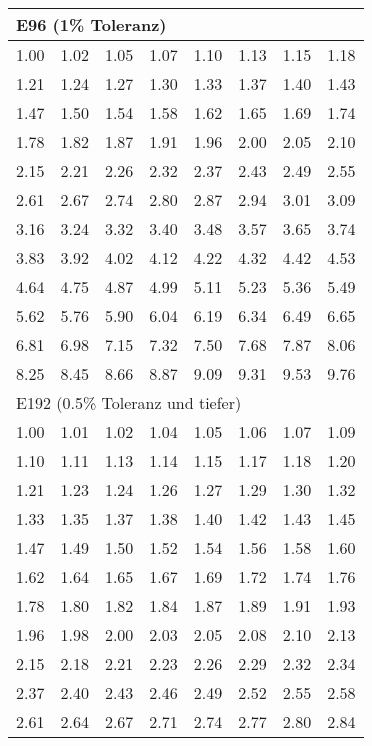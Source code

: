 	\begin{emphbox}
	\begin{tabular}{llllllll}
			\multicolumn{8}{l}{E96 (1\% Toleranz)} \\
			\hline
			1.00 & 1.02 & 1.05 & 1.07 & 1.10 & 1.13 & 1.15 & 1.18 \\
			1.21 & 1.24 & 1.27 & 1.30 & 1.33 & 1.37 & 1.40 & 1.43 \\
			1.47 & 1.50 & 1.54 & 1.58 & 1.62 & 1.65 & 1.69 & 1.74 \\
			1.78 & 1.82 & 1.87 & 1.91 & 1.96 & 2.00 & 2.05 & 2.10 \\
			2.15 & 2.21 & 2.26 & 2.32 & 2.37 & 2.43 & 2.49 & 2.55 \\
			2.61 & 2.67 & 2.74 & 2.80 & 2.87 & 2.94 & 3.01 & 3.09 \\
			3.16 & 3.24 & 3.32 & 3.40 & 3.48 & 3.57 & 3.65 & 3.74 \\
			3.83 & 3.92 & 4.02 & 4.12 & 4.22 & 4.32 & 4.42 & 4.53 \\
			4.64 & 4.75 & 4.87 & 4.99 & 5.11 & 5.23 & 5.36 & 5.49 \\
			5.62 & 5.76 & 5.90 & 6.04 & 6.19 & 6.34 & 6.49 & 6.65 \\
			6.81 & 6.98 & 7.15 & 7.32 & 7.50 & 7.68 & 7.87 & 8.06 \\
			8.25 & 8.45 & 8.66 & 8.87 & 9.09 & 9.31 & 9.53 & 9.76 \\
			\multicolumn{8}{l}{E192 (0.5\% Toleranz und tiefer)} \\
			1.00 & 1.01 & 1.02 & 1.04 & 1.05 & 1.06 & 1.07 & 1.09 \\
			1.10 & 1.11 & 1.13 & 1.14 & 1.15 & 1.17 & 1.18 & 1.20 \\
			1.21 & 1.23 & 1.24 & 1.26 & 1.27 & 1.29 & 1.30 & 1.32 \\
			1.33 & 1.35 & 1.37 & 1.38 & 1.40 & 1.42 & 1.43 & 1.45 \\
			1.47 & 1.49 & 1.50 & 1.52 & 1.54 & 1.56 & 1.58 & 1.60 \\
			1.62 & 1.64 & 1.65 & 1.67 & 1.69 & 1.72 & 1.74 & 1.76 \\
			1.78 & 1.80 & 1.82 & 1.84 & 1.87 & 1.89 & 1.91 & 1.93 \\
			1.96 & 1.98 & 2.00 & 2.03 & 2.05 & 2.08 & 2.10 & 2.13 \\
			2.15 & 2.18 & 2.21 & 2.23 & 2.26 & 2.29 & 2.32 & 2.34 \\
			2.37 & 2.40 & 2.43 & 2.46 & 2.49 & 2.52 & 2.55 & 2.58 \\
			2.61 & 2.64 & 2.67 & 2.71 & 2.74 & 2.77 & 2.80 & 2.84 \\

\end{tabular}
\end{emphbox}
